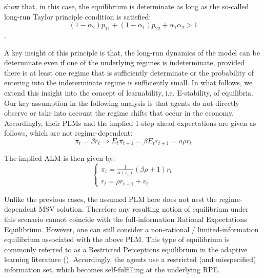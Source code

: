 \documentclass[12pt,reqno]{article}
\numberwithin{equation}{section}
\begin{document}
\cite{davig2007generalizing} show that, in this case, the equilibrium is determinate as long as the so-called long-run Taylor principle condition is satisfied: \\


$$ (1-\alpha_2) p_{11} +(1-\alpha_1) p_{22} + \alpha_1 \alpha_2 > 1 $$. 

A key insight of this principle is that, the long-run dynamics of the model can be determinate even if one of the underlying regimes is indeterminate, provided there is at least one regime that is sufficiently determinate or the probability of entering into the indeterminate regime is sufficiently small. In what follows, we extend this insight into the concept of learnability, i.e. E-stability, of equilibria. Our key assumption in the following analysis is that agents do not directly observe or take into account the regime shifts that occur in the economy. Accordingly, their PLMs and the implied 1-step ahead expectations are given as follows, which are not regime-dependent: \\

$$
\pi_t = \beta r_t  \Rightarrow E_t \pi_{t+1} = \beta E_t r_{t+1} = a \rho r_t 
$$

The implied ALM is then given by: \\

$$
\begin{cases}
\pi_t = \frac{1}{\alpha(s_t)} (\beta \rho + 1) r_t \\
r_t= \rho r_{t-1} + v_t 
\end{cases}
$$ 

Unlike the previous cases, the assumed PLM here does not nest the regime-dependent MSV solution. Therefore any resulting notion of equilibrium under this scenario cannot coincide with the full-information Rational Expectations Equilibrium. However, one can still consider a non-rational / limited-information equilibrium associated with the above PLM. This type of equilibrium is commonly referred to as a Restricted Perceptions equilibrium in the adaptive learning literature (\cite{evans2012learning}). Accordingly, the agents use a restricted (and misspecified) information set, which becomes self-fulfilling at the underlying RPE. \\
\end{document}

